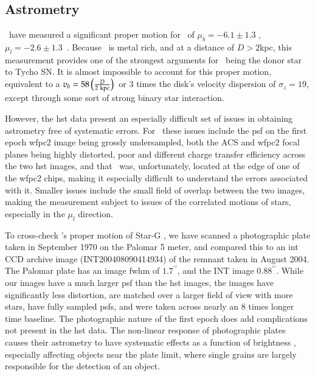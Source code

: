 \subsection{Astrometry}
\rl\ have measured a significant proper motion for \starg\ of $\mu_b=-6.1 \pm 1.3$ \masyr, $\mu_l=-2.6 \pm 1.3$\ \masyr. Because \starg\ is metal rich, and at a distance of $D>2$kpc, this measurement provides one of the strongest arguments for \starg\ being the donor star to Tycho SN. It is almost impossible to account for this proper motion, equivalent to a $v_b=58\left({{D}\over{2\rm{~kpc}}}\right)$\kms\ or 3 times the disk's velocity dispersion of $\sigma_z=19$\kms, except through some sort of strong binary star interaction.  

However, the \gls{hst} data present an especially difficult set of issues in obtaining astrometry free of systematic errors. For \starg\ these issues include the \gls{psf} on the first epoch \gls{wfpc2} image being grossly undersampled, both the ACS and \gls{wfpc2} focal planes being highly distorted,  poor and different charge transfer efficiency across the two \gls{hst} images, and that \starg\ was, unfortunately, located at the edge of one of the \gls{wfpc2} chips, making it especially difficult to understand the errors associated with it. Smaller issues include the small field of overlap between the two images, making the measurement subject to issues of the correlated motions of stars, especially in the $\mu_l$ direction.

To cross-check \rl's proper motion of Star-G , we have scanned a photographic plate taken in
September 1970 on the Palomar 5 meter, and compared this to an \gls{int} CCD archive image (INT200408090414934) of the remnant taken in
August 2004. The Palomar plate has an image \gls{fwhm} of $1.7^{\prime\prime}$, and the INT image $0.88^{\prime\prime}$. While our images have a much larger \gls{psf} than the \gls{hst} images, the images have significantly less distortion, are matched over a larger field of view with more stars, have fully sampled \glspl{psf}, and were taken across nearly an 8 times longer time baseline. The photographic nature of the first epoch does add complications not present in the \gls{hst} data. The non-linear response of photographic plates causes their astrometry to have systematic effects as a function of brightness \citep{2001ASPC..232..311C}, especially affecting objects near the plate limit, where  single grains are largely responsible for the detection of an object. 


